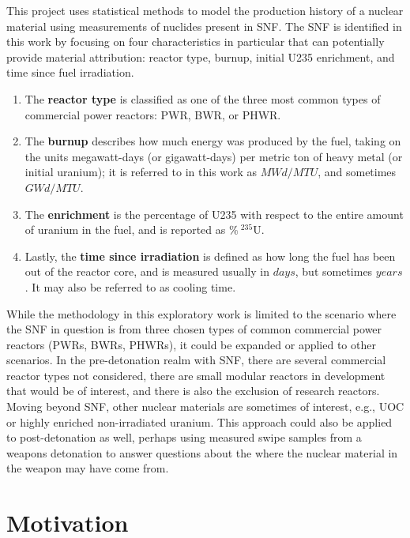 This project uses statistical methods to model the production history of a
nuclear material using measurements of nuclides present in \gls{SNF}. The
\gls{SNF} is identified in this work by focusing on four characteristics in
particular that can potentially provide material attribution: reactor type,
burnup, initial \gls{U235} enrichment, and time since fuel irradiation. 
\begin{enumerate}
  \item The \textbf{reactor type} is classified as one of the three most common
        types of commercial power reactors: \gls{PWR}, \gls{BWR}, or \gls{PHWR}.
  \item The \textbf{burnup} describes how much energy was produced by the fuel,
        taking on the units megawatt-days (or gigawatt-days) per metric 
        ton of heavy metal (or initial uranium); it is referred to in this work 
        as $MWd/MTU$, and sometimes $GWd/MTU$.  
  \item The \textbf{enrichment} is the percentage of \gls{U235} with respect to
        the entire amount of uranium in the fuel, and is reported as 
        $\%\:{}^{235}\text{U}$. 
  \item Lastly, the \textbf{time since irradiation} is defined as how long the
        fuel has been out of the reactor core, and is measured usually in $days$,
        but sometimes $years$. It may also be referred to as cooling time. 
\end{enumerate}

While the methodology in this exploratory work is limited to the scenario where
the \gls{SNF} in question is from three chosen types of common commercial power
reactors (\glspl{PWR}, \glspl{BWR}, \glspl{PHWR}), it could be expanded or
applied to other scenarios. In the pre-detonation realm with \gls{SNF}, there
are several commercial reactor types not considered, there are small modular
reactors in development that would be of interest, and there is also the
exclusion of research reactors. Moving beyond \gls{SNF}, other nuclear
materials are sometimes of interest, e.g., \gls{UOC} or highly enriched
non-irradiated uranium. This approach could also be applied to post-detonation
as well, perhaps using measured swipe samples from a weapons detonation to
answer questions about the where the nuclear material in the weapon may have
come from. 

\section{Motivation}
\label{sec:motivation}

